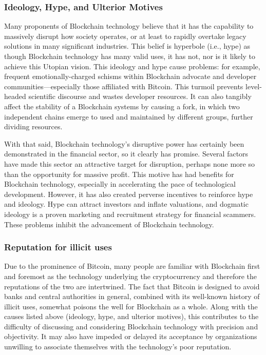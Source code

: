\subsubsection{Ideology, Hype, and Ulterior Motives}
Many proponents of Blockchain technology believe that it has the capability to massively disrupt how society operates, or at least to rapidly overtake legacy solutions in many significant industries. This belief is hyperbole (i.e., hype) as though Blockchain technology has many valid uses, it has not, nor is it likely to achieve this Utopian vision. This ideology and hype cause problems: for example, frequent emotionally-charged schisms within Blockchain advocate and developer communities---especially those affiliated with Bitcoin. This turmoil prevents level-headed scientific discourse and wastes developer resources. It can also tangibly affect the stability of a Blockchain systems by causing a fork, in which two independent chains emerge to used and maintained by different groups, further dividing resources.

With that said, Blockchain technology's disruptive power has certainly been demonstrated in the financial sector, so it clearly has promise. Several factors have made this sector an attractive target for disruption, perhaps none more so than the opportunity for massive profit. This motive has had benefits for Blockchain technology, especially in accelerating the pace of technological development. However, it has also created perverse incentives to reinforce hype and ideology. Hype can attract investors and inflate valuations, and dogmatic ideology is a proven marketing and recruitment strategy for financial scammers. These problems inhibit the advancement of Blockchain technology.

\subsubsection{Reputation for illicit uses}
Due to the prominence of Bitcoin, many people are familiar with Blockchain first and foremost as the technology underlying the cryptocurrency and therefore the reputations of the two are intertwined. The fact that Bitcoin is designed to avoid banks and central authorities in general, combined with its well-known history of illicit uses, somewhat poisons the well for Blockchain as a whole. Along with the causes listed above (ideology, hype, and ulterior motives), this contributes to the difficulty of discussing and considering Blockchain technology with precision and objectivity. It may also have impeded or delayed its acceptance by organizations unwilling to associate themselves with the technology's poor reputation.


